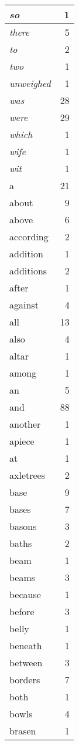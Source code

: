 \begin{center}
\begin{longtable}{l|r}
\emph{so} & 1 \\ \hline
\emph{there} & 5 \\ \hline
\emph{to} & 2 \\ \hline
\emph{two} & 1 \\ \hline
\emph{unweighed} & 1 \\ \hline
\emph{was} & 28 \\ \hline
\emph{were} & 29 \\ \hline
\emph{which} & 1 \\ \hline
\emph{wife} & 1 \\ \hline
\emph{wit} & 1 \\ \hline
a & 21 \\ \hline
about & 9 \\ \hline
above & 6 \\ \hline
according & 2 \\ \hline
addition & 1 \\ \hline
additions & 2 \\ \hline
after & 1 \\ \hline
against & 4 \\ \hline
all & 13 \\ \hline
also & 4 \\ \hline
altar & 1 \\ \hline
among & 1 \\ \hline
an & 5 \\ \hline
and & 88 \\ \hline
another & 1 \\ \hline
apiece & 1 \\ \hline
at & 1 \\ \hline
axletrees & 2 \\ \hline
base & 9 \\ \hline
bases & 7 \\ \hline
basons & 3 \\ \hline
baths & 2 \\ \hline
beam & 1 \\ \hline
beams & 3 \\ \hline
because & 1 \\ \hline
before & 3 \\ \hline
belly & 1 \\ \hline
beneath & 1 \\ \hline
between & 3 \\ \hline
borders & 7 \\ \hline
both & 1 \\ \hline
bowls & 4 \\ \hline
brasen & 1 \\ \hline

\end{longtable}
\end{center}
